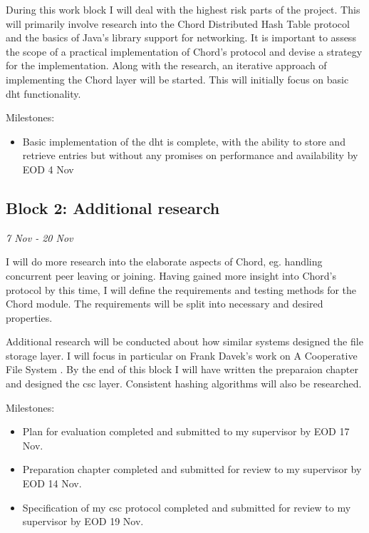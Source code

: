 \documentclass[12pt]{article}
\begin{document}
During this work block I will deal with the highest risk parts of the project. This will primarily involve research into the Chord Distributed Hash Table protocol and the basics of Java's library support for networking. It is important to assess the scope of a practical implementation of Chord's protocol and devise a strategy for the implementation. Along with the research, an iterative approach of implementing the Chord layer will be started. This will initially focus on basic \gls{dht} functionality.


Milestones:
\begin{itemize}
\item{Basic implementation of the \gls{dht} is complete, with the ability to store and retrieve entries but without any promises on performance and availability by EOD 4 Nov}
\end{itemize}


\subsection{Block 2: Additional research}
\emph{7 Nov - 20 Nov}  %

I will do more research into the elaborate aspects of Chord, eg. handling concurrent peer leaving or joining. Having gained more insight into Chord's protocol by this time, I will define the requirements and testing methods for the Chord module. The requirements will be split into necessary and desired properties.

Additional research will be conducted about how similar systems designed the file storage layer. I will focus in particular on Frank Davek's work on A Cooperative File System \cite{dabekcfs}. By the end of this block I will have written the preparaion chapter and designed the \gls{csc} layer. Consistent hashing algorithms will also be researched.

Milestones:
\begin{itemize}
\item{Plan for evaluation completed and submitted to my supervisor by EOD 17 Nov.}
\item{Preparation chapter completed and submitted for review to my supervisor by EOD 14 Nov.}
\item{Specification of my \gls{csc} protocol completed and submitted for review to my supervisor by EOD 19 Nov.}
\end{itemize}
\end{document}

